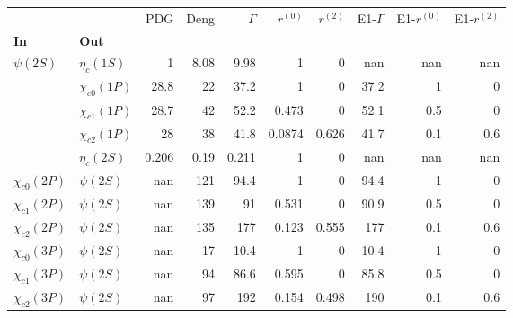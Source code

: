 \begin{tabular}{l|l|r|r|r|r|r|r|r|r}
\toprule
                &            &   PDG &  Deng &  $\Gamma$ &  $r^{(0)}$ &  $r^{(2)}$ &  E1-$\Gamma$ &  E1-$r^{(0)}$ &  E1-$r^{(2)}$ \\
\textbf{In} & \textbf{Out} &       &       &           &            &            &              &               &               \\
\midrule
\textbf{$\psi(2S)$} & \textbf{$\eta_{c}(1S)$} &     1 &  8.08 &      9.98 &          1 &          0 &          nan &           nan &           nan \\
                & \textbf{$\chi_{c0}(1P)$} &  28.8 &    22 &      37.2 &          1 &          0 &         37.2 &             1 &             0 \\
                & \textbf{$\chi_{c1}(1P)$} &  28.7 &    42 &      52.2 &      0.473 &          0 &         52.1 &           0.5 &             0 \\
                & \textbf{$\chi_{c2}(1P)$} &    28 &    38 &      41.8 &     0.0874 &      0.626 &         41.7 &           0.1 &           0.6 \\
                & \textbf{$\eta_{c}(2S)$} & 0.206 &  0.19 &     0.211 &          1 &          0 &          nan &           nan &           nan \\
\textbf{$\chi_{c0}(2P)$} & \textbf{$\psi(2S)$} &   nan &   121 &      94.4 &          1 &          0 &         94.4 &             1 &             0 \\
\textbf{$\chi_{c1}(2P)$} & \textbf{$\psi(2S)$} &   nan &   139 &        91 &      0.531 &          0 &         90.9 &           0.5 &             0 \\
\textbf{$\chi_{c2}(2P)$} & \textbf{$\psi(2S)$} &   nan &   135 &       177 &      0.123 &      0.555 &          177 &           0.1 &           0.6 \\
\textbf{$\chi_{c0}(3P)$} & \textbf{$\psi(2S)$} &   nan &    17 &      10.4 &          1 &          0 &         10.4 &             1 &             0 \\
\textbf{$\chi_{c1}(3P)$} & \textbf{$\psi(2S)$} &   nan &    94 &      86.6 &      0.595 &          0 &         85.8 &           0.5 &             0 \\
\textbf{$\chi_{c2}(3P)$} & \textbf{$\psi(2S)$} &   nan &    97 &       192 &      0.154 &      0.498 &          190 &           0.1 &           0.6 \\
\bottomrule
\end{tabular}

